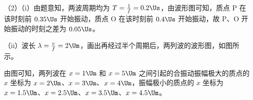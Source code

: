 \documentclass[\gkver]{gaokaozhenti}
\begin{document}
\begin{enumerate}
{（2）（i）由题意知，两波周期均为 $T=\frac{1}{f}=0.2\Us$，由波形图可知，质点 P 在该时刻前 $0.35\Us$ 开始振动，质点 O 在该时刻前 $0.4\Us$ 开始振动，故 P、O 开始振动的时刻之差为 $0.05\Us$。

（ii）波长 $\lambda=\frac{v}{f}=2\Um$，画出再经过半个周期后，两列波的波形图，如图所示。


由图可知，两列波在 $x=1\Um$ 和 $x=5\Um$ 之间引起的合振动振幅极大的质点的 $x$ 坐标为 $x=2\Um$、$x=3\Um$、$x=4\Um$，振幅极小的质点的 $x$ 坐标为 $x=1.5\Um$、$x=2.5\Um$、$x=3.5\Um$、$x=4.5\Um$。
}

\end{enumerate}
\end{document}

